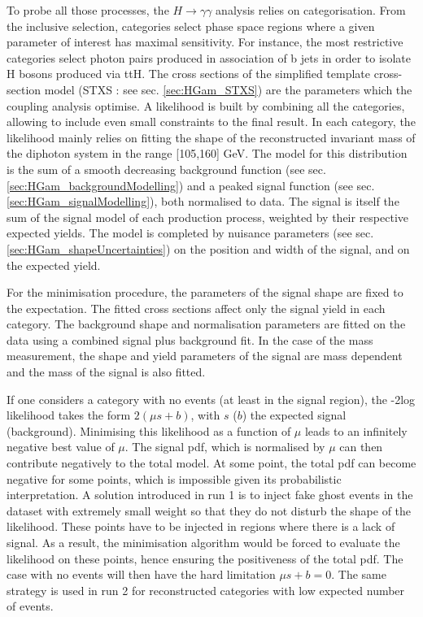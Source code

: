 To probe all those processes, the \(H\rightarrow \gamma\gamma\) analysis relies on categorisation.
From the inclusive selection, categories select phase space regions where a given parameter of interest has maximal sensitivity.
For instance, the most restrictive categories select photon pairs produced in association of b jets in order to isolate H bosons produced via ttH.
The cross sections of the simplified template cross-section model (STXS : see sec. \ref{sec:HGam_STXS}) are the parameters which the coupling analysis optimise.
A likelihood is built by combining all the categories, allowing to include even small constraints to the final result.
In each category, the likelihood mainly relies on fitting the shape of the reconstructed invariant mass of the diphoton system in the range [105,160] GeV.
The model for this distribution is the sum of  a smooth decreasing background function (see sec. \ref{sec:HGam_backgroundModelling}) and a peaked signal function (see sec. \ref{sec:HGam_signalModelling}), both normalised to data.
The signal is itself the sum of the signal model of each production process, weighted by their respective expected yields.
The model is completed by nuisance parameters (see sec. \ref{sec:HGam_shapeUncertainties}) on the position and width of the signal, and on the expected yield.

For the minimisation procedure, the parameters of the signal shape are fixed to the expectation.
The fitted cross sections affect only the signal yield in each category.
The background shape and normalisation parameters are fitted on the data using a combined signal plus background fit.
In the case of the mass measurement, the shape and yield parameters of the signal are mass dependent and the mass of the signal is also fitted.

If one considers a category with no events (at least in the signal region), the -2log likelihood takes the form $2(\mu s+b)$, with $s$ ($b$) the expected signal (background).
Minimising this likelihood as a function of $\mu$ leads to an infinitely negative best value of $\mu$.
The signal pdf, which is normalised by $\mu$ can then contribute negatively to the total model.
At some point, the total pdf can become negative for some points, which is impossible given its probabilistic interpretation.
A solution introduced in run 1 is to inject fake ghost events in the dataset with extremely small weight so that they do not disturb the shape of the likelihood.
These points have to be injected in regions where there is a lack of signal.
As a result, the minimisation algorithm would be forced to evaluate the likelihood on these points, hence ensuring the positiveness of the total pdf.
The case with no events will then have the hard limitation $\mu s+b=0$.
The same strategy is used in run 2 for reconstructed categories with low expected number of events.

